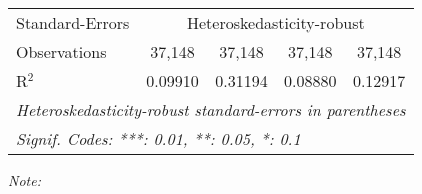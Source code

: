 \begin{table}[htbp!]
\begin{adjustbox}{width = 1\textwidth, max height = 0.95\textheight, center}
\begin{threeparttable}[b]
\begin{tabular}{lcccc}
            \midrule 
            Standard-Errors & \multicolumn{4}{c}{Heteroskedasticity-robust} \\ 
            Observations         & 37,148                         & 37,148                         & 37,148                        & 37,148\\  
            R$^2$                & 0.09910                        & 0.31194                        & 0.08880                       & 0.12917\\  
            \midrule \midrule
            \multicolumn{5}{l}{\emph{Heteroskedasticity-robust standard-errors in parentheses}}\\
            \multicolumn{5}{l}{\emph{Signif. Codes: ***: 0.01, **: 0.05, *: 0.1}}\\
         \end{tabular}
         
         \begin{tablenotes}\item \medskip \textit{Note:}
         \end{tablenotes}
      \end{threeparttable}
   \end{adjustbox}
\end{table}


